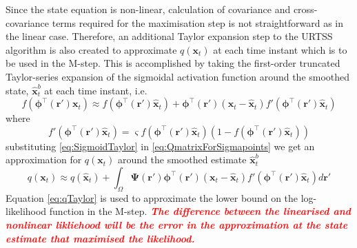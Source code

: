\documentclass[]{article}
\newcommand{\dean}[1]{\textsf{\emph{\textbf{\textcolor{red}{#1}}}}}
\begin{document}
Since the state equation is non-linear,  calculation of covariance and  cross-covariance terms required for the maximisation step is not straightforward as in the linear case. Therefore, an additional  Taylor expansion step to the URTSS algorithm is also created to approximate $q(\mathbf{x}_t)$ at each time instant which is to be used in the M-step. This is accomplished by taking the first-order truncated Taylor-series expansion of the sigmoidal activation function  around the smoothed state, $\hat{\mathbf x}_t^{b}$ at each time instant, i.e.
\begin{equation}\label{eq:SigmoidTaylor}
 f\left(\boldsymbol \phi^\top\left(\mathbf r'\right)\mathbf x_t\right) \approx f\left(\boldsymbol \phi^\top(\mathbf r')\hat{\mathbf x}_t\right)+  \boldsymbol \phi^\top\left(\mathbf r'\right)\left(\mathbf x_t - \hat{\mathbf x}_t\right)f'\left(\boldsymbol \phi^\top\left(\mathbf r'\right)\hat{\mathbf x}_t\right)
\end{equation}
where 
\begin{equation}\label{eq:SigmoidDerivative}
 f'\left(\boldsymbol \phi^\top\left(\mathbf r'\right)\hat{\mathbf x}_t\right)=\varsigma f\left(\boldsymbol \phi^\top\left(\mathbf r'\right)\hat{\mathbf x}_t\right)\left( 1-f\left( \boldsymbol \phi^\top\left(\mathbf r'\right)\hat{\mathbf x}_t\right)\right)
\end{equation}
substituting \ref{eq:SigmoidTaylor} in \ref{eq:QmatrixForSigmapoints}  we get an approximation for $q(\mathbf x_t)$ around the smoothed estimate $\hat{\mathbf{x}}_t^b$ 
\begin{equation}\label{eq:qTaylor}
 q(\mathbf x_t) \approx q\left(\hat{\mathbf x}_t\right)+\int_\Omega \boldsymbol{\Psi}\left(\mathbf{r}'\right)\boldsymbol \phi^\top\left(\mathbf r'\right) \left(\mathbf x_t -\hat{\mathbf x}_t\right)f'\left(\boldsymbol \phi^\top\left(\mathbf r'\right)\hat{\mathbf x}_t\right) d\mathbf{r}'
\end{equation}
Equation \ref{eq:qTaylor} is used to approximate the lower bound on the log-likelihood function in the M-step. \dean{The difference between the linearised and nonlinear likliehood will be the error in the approximation at the state estimate that maximised the likelihood.}
\end{document}
